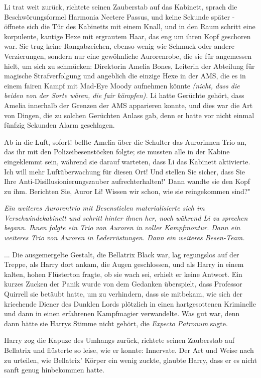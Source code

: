 Li trat weit zurück, richtete seinen Zauberstab auf das Kabinett, sprach die
Beschwörungsformel \glqq Harmonia Nectere Passus\grqq{}, und keine Sekunde
später - öffnete sich die Tür des Kabinetts mit einem Knall, und in den Raum
schritt eine korpulente, kantige Hexe mit ergrautem Haar, das eng um ihren Kopf
geschoren war. Sie trug keine Rangabzeichen, ebenso wenig wie Schmuck oder
andere Verzierungen, sondern nur eine gewöhnliche Aurorenrobe, die sie für
angemessen hielt, um sich zu schmücken: Direktorin Amelia Bones, Leiterin der
Abteilung für magische Strafverfolgung und angeblich die einzige Hexe in der
AMS, die es in einem fairen Kampf mit Mad-Eye Moody aufnehmen könnte
\emph{(nicht, dass die beiden von der Sorte wären, die fair kämpfen).} Li hatte
Gerüchte gehört, dass Amelia innerhalb der Grenzen der AMS apparieren konnte,
und dies war die Art von Dingen, die zu solchen Gerüchten Anlass gab, denn er
hatte vor nicht einmal fünfzig Sekunden Alarm geschlagen.

\glqq Ab in die Luft, sofort!\grqq{} bellte Amelia über die Schulter das
Aurorinnen-Trio an, das ihr mit den Polizeibesenstöcken folgte; sie mussten alle
in der Kabine eingeklemmt sein, während sie darauf warteten, dass Li das
Kabinett aktivierte. \glqq Ich will mehr Luftüberwachung für diesen Ort! Und
stellen Sie sicher, dass Sie Ihre Anti-Disillusionierungszauber
aufrechterhalten!" Dann wandte sie den Kopf zu ihm. \glqq Berichten Sie, Auror
Li! Wissen wir schon, wie sie reingekommen sind?"

\emph{Ein weiteres Aurorentrio mit Besenstielen materialisierte sich im Verschwindekabinett und schritt hinter ihnen her, noch während Li zu sprechen begann. Ihnen folgte ein Trio von Auroren in voller Kampfmontur. Dann ein weiteres Trio von Auroren in Lederrüstungen. Dann ein weiteres Besen-Team.}

... Die ausgemergelte Gestalt, die Bellatrix Black war, lag regungslos auf der
Treppe, als Harry dort ankam, die Augen geschlossen, und als Harry in einem
kalten, hohen Flüsterton fragte, ob sie wach sei, erhielt er keine Antwort. Ein
kurzes Zucken der Panik wurde von dem Gedanken überspielt, dass Professor
Quirrell sie betäubt hatte, um zu verhindern, dass sie mitbekam, wie sich der
kriechende Diener des Dunklen Lords plötzlich in einen hartgesottenen Kriminelle
und dann in einen erfahrenen Kampfmagier verwandelte. Was gut war, denn dann
hätte sie Harrys Stimme nicht gehört, die \emph{\glqq Expecto Patronum\grqq{}
}sagte.

Harry zog die Kapuze des Umhangs zurück, richtete seinen Zauberstab auf
Bellatrix und flüsterte so leise, wie er konnte: \glqq Innervate.\grqq{} Der Art
und Weise nach zu urteilen, wie Bellatrix' Körper ein wenig zuckte, glaubte
Harry, dass er es nicht sanft genug hinbekommen hatte.

